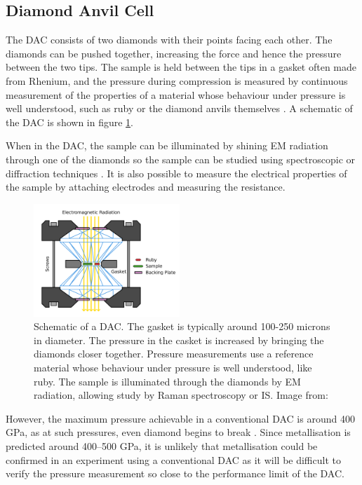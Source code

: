 \documentclass[esp]{FCEFyN-class}
\begin{document}
\subsection{Diamond Anvil Cell}

The DAC consists of two diamonds with their points facing each other. The diamonds can be pushed together, increasing the force and hence the pressure between the two tips. The sample is held between the tips in a gasket often made from Rhenium, and the pressure during compression is measured by continuous measurement of the properties of a material whose behaviour under pressure is well understood, such as ruby \cite{Burnley2018} or the diamond anvils themselves \cite{LoubeyreTDAC}. A schematic of the DAC is shown in figure \ref{fig:DACfig}.

When in the DAC, the sample can be illuminated by shining EM radiation through one of the diamonds so the sample can be studied using spectroscopic or diffraction techniques \cite{Burnley2018}. It is also possible to measure the electrical properties of the sample by attaching electrodes and measuring the resistance.

\begin{figure}[H]
    \centering
    \includegraphics[width=0.49\textwidth]{DACfig.pdf}
    \caption{Schematic of a DAC. The gasket is typically around 100-250 microns in diameter. The pressure in the casket is increased by bringing the diamonds closer together. Pressure measurements use a reference material whose behaviour under pressure is well understood, like ruby. The sample is illuminated through the diamonds by EM radiation, allowing study by Raman spectroscopy or IS. Image from: \cite{tobias2012}}
    \label{fig:DACfig}
\end{figure}
\vspace{3mm} %
However, the maximum pressure achievable in a conventional DAC is around 400 GPa, as at such pressures, even diamond begins to break \cite{li_ji_yang_2018}. Since metallisation is predicted around 400--500 GPa, it is unlikely that metallisation could be confirmed in an experiment using a conventional DAC as it will be difficult to verify the pressure measurement so close to the performance limit of the DAC.
\end{document}
